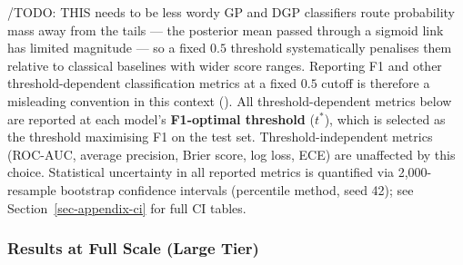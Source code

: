 \documentclass[
  letterpaper,
  DIV=11,
  numbers=noendperiod]{scrartcl}
\begin{document}
/TODO: THIS needs to be less wordy GP and DGP classifiers route
probability mass away from the tails --- the posterior mean passed
through a sigmoid link has limited magnitude --- so a fixed \(0.5\)
threshold systematically penalises them relative to classical baselines
with wider score ranges. Reporting F1 and other threshold-dependent
classification metrics at a fixed \(0.5\) cutoff is therefore a
misleading convention in this context
(). All threshold-dependent metrics below are reported at
each model's \textbf{F1-optimal threshold} (\(t^*\)), which is selected
as the threshold maximising F1 on the test set. Threshold-independent
metrics (ROC-AUC, average precision, Brier score, log loss, ECE) are
unaffected by this choice. Statistical uncertainty in all reported
metrics is quantified via 2,000-resample bootstrap confidence intervals
(percentile method, seed 42); see Section~\ref{sec-appendix-ci} for full
CI tables.

\subsubsection{Results at Full Scale (Large Tier)}\label{sec-uci-large}
\end{document}

